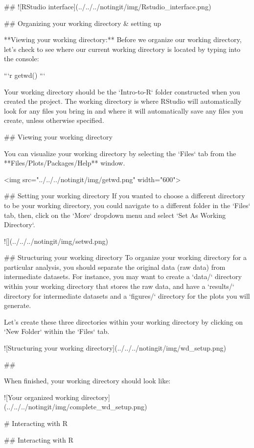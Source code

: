 ##
![RStudio interface](../../../notingit/img/Rstudio_interface.png)


## Organizing your working directory & setting up

**Viewing your working directory:**
Before we organize our working directory, let's check to see where our current working directory is located by typing into the console:

```r
getwd()
```

Your working directory should be the `Intro-to-R` folder constructed when you created the project. The working directory is where RStudio will automatically look for any files you bring in and where it will automatically save any files you create, unless otherwise specified. 

## Viewing your working directory

You can visualize your working directory by selecting the `Files` tab from the **Files/Plots/Packages/Help** window. 

<img src="../../../notingit/img/getwd.png" width="600">

## Setting your working directory
If you wanted to choose a different directory to be your working directory, you could navigate to a different folder in the `Files` tab, then, click on the `More` dropdown menu and select `Set As Working Directory`.
 
![](../../../notingit/img/setwd.png)


## Structuring your working directory
To organize your working directory for a particular analysis, you should separate the original data (raw data) from intermediate datasets. For instance, you may want to create a `data/` directory within your working directory that stores the raw data, and have a `results/` directory for intermediate datasets and a `figures/` directory for the plots you will generate.

Let's create these three directories within your working directory by clicking on `New Folder` within the `Files` tab. 

![Structuring your working directory](../../../notingit/img/wd_setup.png)

## 

When finished, your working directory should look like:

![Your organized working directory](../../../notingit/img/complete_wd_setup.png)


# Interacting with R

## Interacting with R

